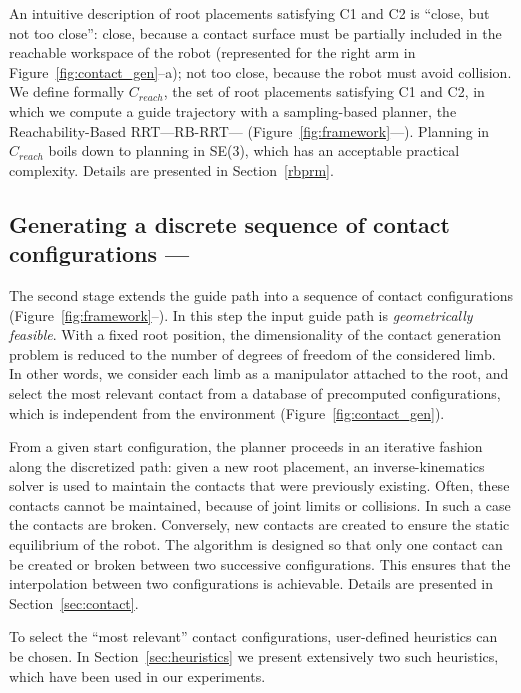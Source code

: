 An intuitive description of root placements satisfying C1 and C2 is ``close, but not too close'': close, because a contact surface must be partially included in the reachable workspace of the robot (represented for the right arm in Figure~\ref{fig:contact_gen}--a); not too close, because the robot must avoid collision. We define formally $C_{reach}$, the set of root placements satisfying C1 and C2, in which we compute a guide trajectory with a sampling-based planner, the Reachability-Based RRT---RB-RRT--- (Figure~\ref{fig:framework}---\Pa). Planning in $C_{reach}$ boils down to planning in SE(3), which has an acceptable practical complexity.
%
Details are presented in Section~\ref{rbprm}.

\subsection{Generating a discrete sequence of contact configurations --- \Pb}

The second stage extends the guide path into a sequence of contact configurations (Figure~\ref{fig:framework}--\Pb). In this
step the input guide path is \textit{geometrically feasible}.
With a fixed root position, the dimensionality of the 
contact generation problem is reduced to the number of degrees of freedom of the considered limb. In other words, we consider each limb as a manipulator attached to the root, and select the most relevant contact from a database of precomputed configurations, which is independent from the environment (Figure~\ref{fig:contact_gen}).

From a given start configuration, the planner proceeds in an iterative fashion along the discretized path: given a new root placement, an inverse-kinematics solver 
is used to maintain the contacts that were previously existing. Often, these contacts cannot be maintained, because of joint limits or collisions.
In such a case the contacts are broken. Conversely, new contacts are created to ensure the static equilibrium of the robot.
The algorithm is designed so that only one contact can be created or broken between two successive configurations. This ensures that the interpolation between two configurations is achievable.
Details are presented in Section~\ref{sec:contact}. 

To select the ``most relevant'' contact configurations, user-defined heuristics can be chosen. In Section~\ref{sec:heuristics} we present extensively two such heuristics, which have been used in our experiments.



